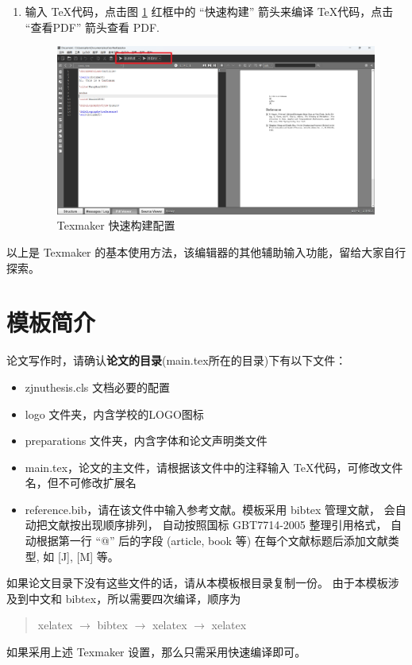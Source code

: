 \documentclass[twoside,doctor]{zjnuthesis}
\begin{document}
\begin{enumerate}[1.]
\item 输入 \TeX 代码，点击图 \ref{fg:button} 红框中的 ``快速构建'' 箭头来编译 \TeX 代码，点击 ``查看PDF'' 箭头查看 PDF.
  \begin{figure}[H]
    \centering
    \includegraphics[width=.8\textwidth]{images/button.png}
    \caption{Texmaker 快速构建配置}
    \label{fg:button}
  \end{figure}
\end{enumerate}

以上是 Texmaker 的基本使用方法，该编辑器的其他辅助输入功能，留给大家自行探索。

\section{模板简介}

论文写作时，请确认\textbf{论文的目录}(main.tex所在的目录)下有以下文件：
\begin{itemize}
\item zjnuthesis.cls 文档必要的配置
\item logo 文件夹，内含学校的LOGO图标
\item preparations 文件夹，内含字体和论文声明类文件
\item main.tex，论文的主文件，请根据该文件中的注释输入 \TeX 代码，可修改文件名，但不可修改扩展名
\item reference.bib，请在该文件中输入参考文献。模板采用 bibtex 管理文献，
  会自动把文献按出现顺序排列，
  自动按照国标 GBT7714-2005 整理引用格式，
  自动根据第一行 \enquote{@} 后的字段 (article, book 等) 在每个文献标题后添加文献类型, 如 [J], [M] 等。
\end{itemize}

如果论文目录下没有这些文件的话，请从本模板根目录复制一份。
由于本模板涉及到中文和 bibtex，所以需要四次编译，顺序为
\begin{quote}
  xelatex \(\rightarrow\) bibtex \(\rightarrow\) xelatex \(\rightarrow\) xelatex
\end{quote}
如果采用上述 Texmaker 设置，那么只需采用快速编译即可。
\end{document}
